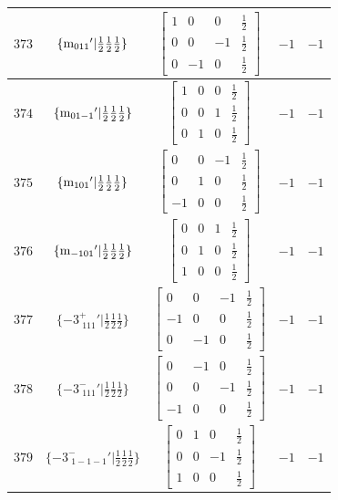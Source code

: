 \documentclass[fleqn,8pt]{jsarticle}
\begin{document}
\begin{longtable}{ccccc}
$ 373 $ & $ \{{\rm m}_{011}{}'|\frac{1}{2} \frac{1}{2} \frac{1}{2}\} $ & $ \begin{bmatrix} 1 & 0 & 0 & \frac{1}{2} \\ 0 & 0 & -1 & \frac{1}{2} \\ 0 & -1 & 0 & \frac{1}{2} \end{bmatrix} $ & $ -1 $ & $ -1 $ \\ \hline
$ 374 $ & $ \{{\rm m}_{01-1}{}'|\frac{1}{2} \frac{1}{2} \frac{1}{2}\} $ & $ \begin{bmatrix} 1 & 0 & 0 & \frac{1}{2} \\ 0 & 0 & 1 & \frac{1}{2} \\ 0 & 1 & 0 & \frac{1}{2} \end{bmatrix} $ & $ -1 $ & $ -1 $ \\ \hline
$ 375 $ & $ \{{\rm m}_{101}{}'|\frac{1}{2} \frac{1}{2} \frac{1}{2}\} $ & $ \begin{bmatrix} 0 & 0 & -1 & \frac{1}{2} \\ 0 & 1 & 0 & \frac{1}{2} \\ -1 & 0 & 0 & \frac{1}{2} \end{bmatrix} $ & $ -1 $ & $ -1 $ \\ \hline
$ 376 $ & $ \{{\rm m}_{-101}{}'|\frac{1}{2} \frac{1}{2} \frac{1}{2}\} $ & $ \begin{bmatrix} 0 & 0 & 1 & \frac{1}{2} \\ 0 & 1 & 0 & \frac{1}{2} \\ 1 & 0 & 0 & \frac{1}{2} \end{bmatrix} $ & $ -1 $ & $ -1 $ \\ \hline
$ 377 $ & $ \{-3^{+}_{\,\,111}{}'|\frac{1}{2} \frac{1}{2} \frac{1}{2}\} $ & $ \begin{bmatrix} 0 & 0 & -1 & \frac{1}{2} \\ -1 & 0 & 0 & \frac{1}{2} \\ 0 & -1 & 0 & \frac{1}{2} \end{bmatrix} $ & $ -1 $ & $ -1 $ \\ \hline
$ 378 $ & $ \{-3^{-}_{\,\,111}{}'|\frac{1}{2} \frac{1}{2} \frac{1}{2}\} $ & $ \begin{bmatrix} 0 & -1 & 0 & \frac{1}{2} \\ 0 & 0 & -1 & \frac{1}{2} \\ -1 & 0 & 0 & \frac{1}{2} \end{bmatrix} $ & $ -1 $ & $ -1 $ \\ \hline
$ 379 $ & $ \{-3^{-}_{\,\,1-1-1}{}'|\frac{1}{2} \frac{1}{2} \frac{1}{2}\} $ & $ \begin{bmatrix} 0 & 1 & 0 & \frac{1}{2} \\ 0 & 0 & -1 & \frac{1}{2} \\ 1 & 0 & 0 & \frac{1}{2} \end{bmatrix} $ & $ -1 $ & $ -1 $ \\ \hline

\end{longtable}
\end{document}
